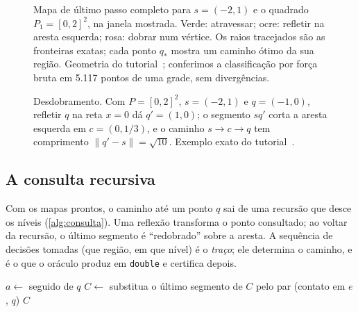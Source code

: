\documentclass[11pt,a4paper]{article}
\theoremstyle{plain}\newtheorem{proposicao}{Proposição}
\theoremstyle{definition}\newtheorem{definicao}{Definição}
\theoremstyle{plain}\newtheorem{teorema}{Teorema}
\newcommand{\norm}[1]{\lVert#1\rVert}
\begin{document}
\begin{figure}[ht]\centering\figmapa
\caption{Mapa de último passo completo para \(s=(-2,1)\) e o quadrado \(P_1=[0,2]^2\), na janela mostrada. Verde: atravessar; ocre: refletir na aresta esquerda; rosa: dobrar num vértice. Os raios tracejados são as fronteiras exatas; cada ponto \(q_\ast\) mostra um caminho ótimo da sua região. Geometria do tutorial~\cite{tutorial}; conferimos a classificação por força bruta em 5.117 pontos de uma grade, sem divergências.}\label{fig:mapa}
\end{figure}

\begin{figure}[ht]\centering\figdesdobra
\caption{Desdobramento. Com \(P=[0,2]^2\), \(s=(-2,1)\) e \(q=(-1,0)\), refletir \(q\) na reta \(x=0\) dá \(q'=(1,0)\); o segmento \(sq'\) corta a aresta esquerda em \(c=(0,1/3)\), e o caminho \(s\to c\to q\) tem comprimento \(\norm{q'-s}=\sqrt{10}\). Exemplo exato do tutorial~\cite{tutorial}.}\label{fig:desdobra}
\end{figure}

\subsection{A consulta recursiva}
Com os mapas prontos, o caminho até um ponto \(q\) sai de uma recursão que desce os níveis (\cref{alg:consulta}). Uma reflexão transforma o ponto consultado; ao voltar da recursão, o último segmento é ``redobrado'' sobre a aresta. A sequência de decisões tomadas (que região, em que nível) é o \emph{traço}; ele determina o caminho, e é o que o oráculo produz em \texttt{double} e certifica depois.

\begin{algorithm}[ht]\small
\caption{Consulta do caminho ótimo até \(q\) no nível \(i\) (esquema; versão completa no tutorial~\cite{tutorial}).}\label{alg:consulta}
\begin{algorithmic}[1]
  \State $a\gets$ 
   \Return {}
   \Return {} seguido de $q$
  \Else{}
    \State $C\gets$ 
    \State substitua o último segmento de $C$ pelo par (contato em $e$, $q$)
    \State \Return $C$
  \EndIf
\EndFunction
\end{algorithmic}
\end{algorithm}
\end{document}
